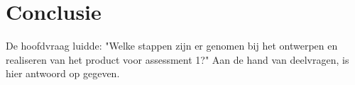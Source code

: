 \section{Conclusie}
De hoofdvraag luidde: "Welke stappen zijn er genomen bij het ontwerpen en realiseren van het product voor assessment 1?"
Aan de hand van deelvragen, is hier antwoord op gegeven. 